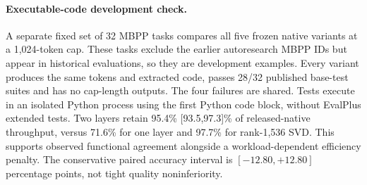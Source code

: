 \paragraph{Executable-code development check.}
A separate fixed set of 32 MBPP tasks compares all five frozen native
variants at a 1,024-token cap. These tasks exclude the earlier autoresearch
MBPP IDs but appear in historical evaluations, so they are development
examples. Every variant produces the same tokens and extracted code,
passes 28/32 published base-test suites and has no cap-length outputs.
The four failures are shared. Tests execute in an isolated Python process
using the first Python code block, without EvalPlus extended tests.
Two layers retain 95.4\% [93.5,97.3]\% of released-native throughput, versus 71.6\% for one layer and 97.7\% for rank-1,536 SVD.
This supports observed functional agreement alongside a workload-dependent
efficiency penalty. The conservative paired accuracy interval is
$[-12.80,+12.80]$ percentage points, not tight quality noninferiority.
